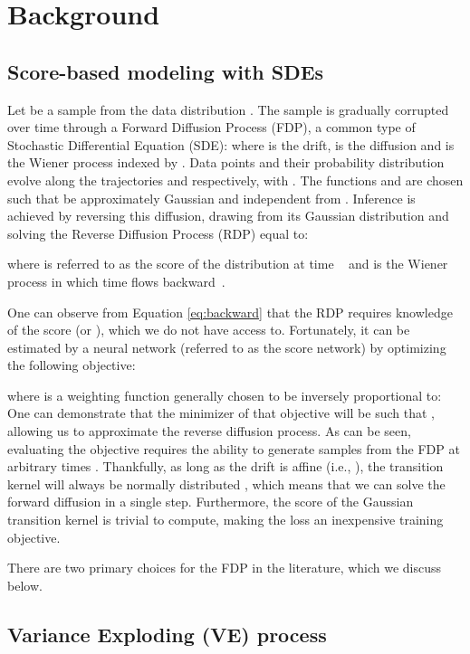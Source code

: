 \documentclass{article}
\begin{document}
\section{Background}

\subsection{Score-based modeling with SDEs}

Let  be a sample from the data distribution . 
The sample is gradually corrupted over time through a Forward Diffusion Process (FDP), a common type of Stochastic Differential Equation (SDE): 
where  is the drift,  is the diffusion and  is the Wiener process indexed by . Data points and their probability distribution evolve along the trajectories  and  respectively, with . 
The functions  and  are chosen such that  be approximately Gaussian and independent from . 
Inference is achieved by reversing this diffusion, drawing  from its Gaussian distribution and solving the Reverse Diffusion Process (RDP) equal to:

where  is referred to as the score
of the distribution at time ~\citep{hyvarinen2005estimation} and  is the Wiener process in which time flows backward~\citep{anderson1982reverse}.

One can observe from Equation \ref{eq:backward} that the RDP requires knowledge of the score (or ), which we do not have access to. Fortunately, it can be estimated by a neural network (referred to as the score network) by optimizing the following objective:

where  is a weighting function generally chosen to be inversely proportional to:  One can demonstrate that the minimizer of that objective  will be such that  \citep{vincent2011connection}, allowing us to approximate the reverse diffusion process. As can be seen, evaluating the objective requires the ability to generate samples from the FDP at arbitrary times . Thankfully, as long as the drift is affine (i.e., ), the transition kernel  will always be normally distributed \citep{sarkka2019applied}, which means that we can solve the forward diffusion in a single step. Furthermore, the score of the Gaussian transition kernel is trivial to compute, making the loss an inexpensive training objective. 

There are two primary choices for the FDP in the literature, which we discuss below.

\subsection{Variance Exploding (VE) process}
\end{document}
